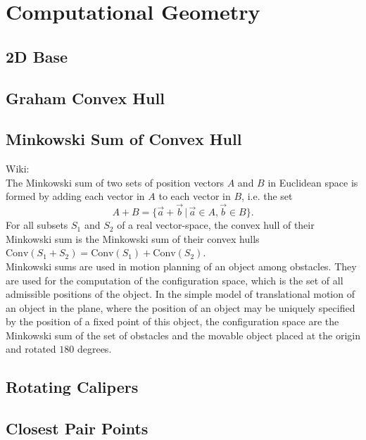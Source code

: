 \documentclass[10pt]{article}
\begin{document}
\section{Computational Geometry}
\subsection{2D Base}

\subsection{Graham Convex Hull}

\subsection{Minkowski Sum of Convex Hull}
\noindent
Wiki: \\
The Minkowski sum of two sets of position vectors $A$ and $B$ in Euclidean space is formed by adding each vector in $A$ to each vector in $B$, i.e. the set
\begin{displaymath}
A+B=\{ \vec{a} + \vec{b} \, | \, \vec{a} \in A, \vec{b} \in B \}.
\end{displaymath}
For all subsets $S_1$ and $S_2$ of a real vector-space, the convex hull of their Minkowski sum is the Minkowski sum of their convex hulls $\mathrm{Conv} (S_1 + S_2) = \mathrm{Conv} (S_1) + \mathrm{Conv} (S_2)$. \\
Minkowski sums are used in motion planning of an object among obstacles. They are used for the computation of the configuration space, which is the set of all admissible positions of the object. In the simple model of translational motion of an object in the plane, where the position of an object may be uniquely specified by the position of a fixed point of this object, the configuration space are the Minkowski sum of the set of obstacles and the movable object placed at the origin and rotated $180$ degrees. \\

\subsection{Rotating Calipers}

\subsection{Closest Pair Points}

\end{document}
